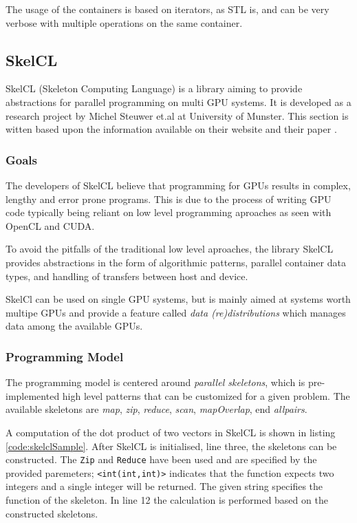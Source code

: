 The usage of the containers is based on iterators, as STL is, and can be very verbose with multiple operations on the same container.

\subsection{SkelCL}
SkelCL (Skeleton Computing Language) is a library aiming to provide abstractions for parallel programming on multi GPU systems. It is developed as a research project by Michel Steuwer et.al at University of Munster. This section is witten based upon the information available on their website \cite{skelclWebsite} and their paper \cite{skelclPaper}.

\subsubsection{Goals}
The developers of SkelCL believe that programming for GPUs results in complex, lengthy and error prone programs. This is due to the process of writing GPU code typically being reliant on low level programming aproaches as seen with OpenCL and CUDA. 

To avoid the pitfalls of the traditional low level aproaches, the library SkelCL provides abstractions in the form of algorithmic patterns, parallel container data types, and handling of transfers between host and device. 

SkelCl can be used on single GPU systems, but is mainly aimed at systems worth multipe GPUs and provide a feature called \textit{data (re)distributions} which manages data among the available GPUs.

\subsubsection{Programming Model}
The programming model is centered around \textit{parallel skeletons}, which is pre-implemented high level patterns that can be customized for a given problem. The available skeletons are \textit{map}, \textit{zip}, \textit{reduce}, \textit{scan}, \textit{mapOverlap}, end \textit{allpairs}.

A computation of the dot product of two vectors in SkelCL is shown in listing \ref{code:skelclSample}. After SkelCL is initialised, line three, the skeletons can be constructed. The \texttt{Zip} and \texttt{Reduce} have been used and are specified by the provided paremeters; \texttt{<int(int,int)>} indicates that the function expects two integers and a single integer will be returned. The given string specifies the function of the skeleton. In line 12 the calculation is performed based on the constructed skeletons.

